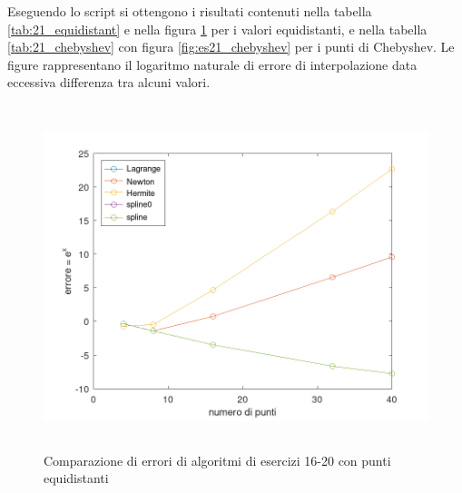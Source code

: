 Eseguendo lo script  si ottengono i risultati contenuti nella
tabella \ref{tab:21_equidistant} e nella figura \ref{fig:es21_equidistant} per
i valori equidistanti, e nella tabella \ref{tab:21_chebyshev} con figura
\ref{fig:es21_chebyshev} per i punti di Chebyshev. Le figure rappresentano
il logaritmo naturale di errore di interpolazione data eccessiva differenza tra
alcuni valori.
\begin{figure}[!ht]
    \centering
    \includegraphics[width=16cm,height=10cm,keepaspectratio]{capitolo4/es21_figure_equidistant.png}
    \caption{Comparazione di errori di algoritmi di esercizi 16-20 con punti equidistanti}
    \label{fig:es21_equidistant}
\end{figure}
\FloatBarrier
